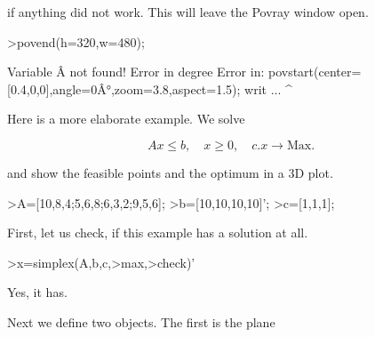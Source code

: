 \documentclass[a4paper,10pt]{article}
\begin{document}
\begin{eulernotebook}
\begin{eulercomment}
if anything did not work. This will leave the Povray window open.
\end{eulercomment}
\begin{eulerprompt}
>povend(h=320,w=480);
\end{eulerprompt}
\begin{euleroutput}
  Variable Â not found!
  Error in degree
  Error in:
  povstart(center=[0.4,0,0],angle=0Â°,zoom=3.8,aspect=1.5); writ ...
                                     ^
\end{euleroutput}
\begin{eulercomment}
Here is a more elaborate example. We solve

\end{eulercomment}
\begin{eulerformula}
\[
Ax \le b, \quad x \ge 0, \quad c.x \to \text{Max.}
\]
\end{eulerformula}
\begin{eulercomment}
and show the feasible points and the optimum in a 3D plot.
\end{eulercomment}
\begin{eulerprompt}
>A=[10,8,4;5,6,8;6,3,2;9,5,6];
>b=[10,10,10,10]';
>c=[1,1,1];
\end{eulerprompt}
\begin{eulercomment}
First, let us check, if this example has a solution at all.
\end{eulercomment}
\begin{eulerprompt}
>x=simplex(A,b,c,>max,>check)'
\end{eulerprompt}
\begin{euleroutput}
  [0,  1,  0.5]
\end{euleroutput}
\begin{eulercomment}
Yes, it has.

Next we define two objects. The first is the plane


\end{eulercomment}
\end{eulernotebook}
\end{document}
